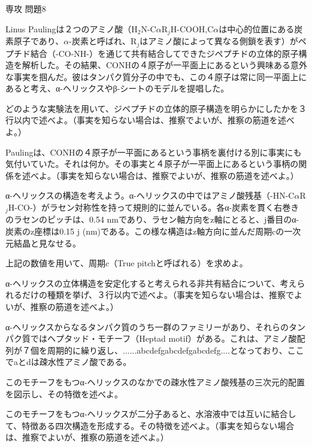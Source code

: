 \documentclass[fleqn]{jbook}
\begin{document}
\begin{question}{専攻 問題8}{}

\begin{subquestions}
\SubQuestion
Linus Paulingは２つのアミノ酸（H$_2$N-C$\alpha$R$_j$H-COOH,C$\alpha$は中心的位置にある炭素原子であり、$\alpha$-炭素と呼ばれ、R$_j$はアミノ酸によって異なる側鎖を表す）がペプチド結合（-CO-NH-）を通じて共有結合してできたジペプチドの立体的原子構造を解析した。その結果、CONHの４原子が一平面上にあるという興味ある意外な事実を掴んだ。彼はタンパク質分子の中でも、この４原子は常に同一平面上にあると考え、α-ヘリックスやβ-シートのモデルを提唱した。

\begin{subsubquestions}
\SubSubQuestion
どのような実験法を用いて、ジペプチドの立体的原子構造を明らかにしたかを３行以内で述べよ。（事実を知らない場合は、推察でよいが、推察の筋道を述べよ。）

\SubSubQuestion
Paulingは、CONHの４原子が一平面にあるという事柄を裏付ける別に事実にも気付いていた。それは何か。その事実と４原子が一平面上にあるという事柄の関係を述べよ。（事実を知らない場合は、推察でよいが、推察の筋道を述べよ。）
\end{subsubquestions}

\SubQuestion

α-ヘリックスの構造を考えよう。α-ヘリックスの中ではアミノ酸残基（-HN-C$\alpha$R$_j$H-CO-）がラセン対称性を持って規則的に並んでいる。各α-炭素を貫く右巻きのラセンのピッチは、0.54 nmであり、ラセン軸方向をz軸にとると、j番目のα-炭素のz座標は0.15 j (nm)である。この様な構造はz軸方向に並んだ周期cの一次元結晶と見なせる。

\begin{subsubquestions}
\SubSubQuestion
上記の数値を用いて、周期$c$（True pitchと呼ばれる）を求めよ。

\SubSubQuestion
α-ヘリックスの立体構造を安定化すると考えられる非共有結合について、考えられるだけの種類を挙げ、３行以内で述べよ。（事実を知らない場合は、推察でよいが、推察の筋道を述べよ。）
\end{subsubquestions}

\SubQuestion
α-ヘリックスからなるタンパク質のうち一群のファミリーがあり、それらのタンパク質ではヘプタッド・モチーフ（Heptad motif）がある。これは、アミノ酸配列が７個を周期的に繰り返し、......abcdefgabcdefgabcdefg....となっており、ここでaとdは疎水性アミノ酸である。

\begin{subsubquestions}
\SubSubQuestion
このモチーフをもつα-ヘリックスのなかでの疎水性アミノ酸残基の三次元的配置を図示し、その特徴を述べよ。

\SubSubQuestion
このモチーフをもつα-ヘリックスが二分子あると、水溶液中では互いに結合して、特徴ある四次構造を形成する。その特徴を述べよ。（事実を知らない場合は、推察でよいが、推察の筋道を述べよ。）
\end{subsubquestions}

\end{subquestions}
\end{question}
\end{document}
